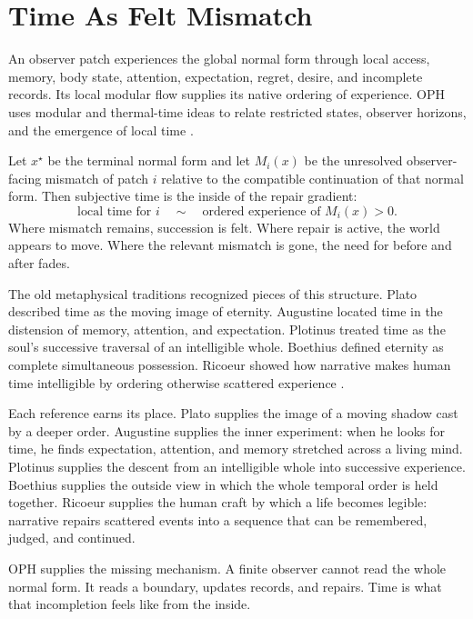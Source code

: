 \documentclass[11pt]{article}
\theoremstyle{remark}
\theoremstyle{plain}
\begin{document}
\section{Time As Felt Mismatch}

An observer patch experiences the global normal form through local access,
memory, body state, attention, expectation, regret, desire, and incomplete
records. Its local modular flow supplies its native ordering of experience.
OPH uses modular and thermal-time ideas to relate restricted states,
observer horizons, and the emergence of local time
\cite{OPHObservers,ConnesRovelli1994,PageWootters1983}.

Let \(x^\star\) be the terminal normal form and let \(M_i(x)\) be the unresolved
observer-facing mismatch of patch \(i\) relative to the compatible continuation
of that normal form. Then subjective time is the inside of the repair gradient:
\[
\boxed{
\text{local time for }i \quad\sim\quad \text{ordered experience of } M_i(x)>0 .
}
\]
Where mismatch remains, succession is felt. Where repair is active, the world
appears to move. Where the relevant mismatch is gone, the need for before and
after fades.

The old metaphysical traditions recognized pieces of this structure. Plato
described time as the moving image of eternity. Augustine located time in the
distension of memory, attention, and expectation. Plotinus treated time as the
soul's successive traversal of an intelligible whole. Boethius defined eternity
as complete simultaneous possession. Ricoeur showed how narrative makes human
time intelligible by ordering otherwise scattered experience
\cite{PlatoTimaeus,AugustineConfessions,PlotinusEnneads,BoethiusConsolation,Ricoeur1984}.

Each reference earns its place. Plato supplies the image of a moving
shadow cast by a deeper order. Augustine supplies the inner experiment: when he
looks for time, he finds expectation, attention, and memory stretched across a
living mind. Plotinus supplies the descent from an intelligible whole into
successive experience. Boethius supplies the outside view in which the whole
temporal order is held together. Ricoeur supplies the human craft by which a
life becomes legible: narrative repairs scattered events into a sequence that
can be remembered, judged, and continued.

OPH supplies the missing mechanism. A finite observer cannot read the whole
normal form. It reads a boundary, updates records, and repairs. Time is what
that incompletion feels like from the inside.
\end{document}
